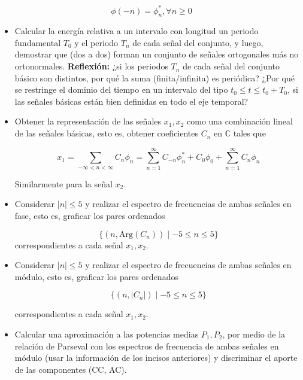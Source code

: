 \documentclass[12pt,a4paper]{report}
\begin{document}
\begin{enumerate}[label=\alph*),left=0pt]
  $$\phi(-n) = \phi_n^*, \forall n \geq 0$$

  \begin{itemize}[left=0pt]

    \item Calcular la energía relativa a un intervalo con longitud un periodo fundamental $T_0$ y el periodo $T_n$ de
      cada señal del conjunto, y luego, demostrar que (dos a dos) forman un conjunto de señales ortogonales más no
      ortonormales.\newline
      \textbf{Reflexión:} ¿si los periodos $T_n$ de cada señal del conjunto básico son distintos, por qué la suma
      (finita/infinita) es periódica? ¿Por qué se restringe el dominio del tiempo en un intervalo del tipo 
      $t_0 \leq t \leq t_0 + T_0$, si las señales básicas están bien definidas en todo el eje temporal?

    \item Obtener la representación de las señales $x_1, x_2$ como una combinación lineal de las señales básicas, esto 
      es, obtener coeficientes $C_n$ en $\mathbb{C}$ tales que

      $$x_1 = \sum_{-\infty < n < \infty} C_n \phi_n =
      \sum_{n=1}^{\infty} C_{-n} \phi_n^* + C_0 \phi_0 + \sum_{n=1}^{\infty} C_n \phi_n$$

      Similarmente para la señal $x_2$.

    \item Considerar $|n| \leq 5$ y realizar el espectro de frecuencias de ambas señales en fase, esto es, graficar los 
      pares ordenados

      $$\{(n, \text{Arg}(C_n)) \mid -5 \leq n \leq 5\}$$
      correspondientes a cada señal $x_1, x_2$.

      \item Considerar $|n| \leq 5$ y realizar el espectro de frecuencias de ambas señales en módulo, esto es, graficar 
        los pares ordenados

      $$\{(n, |C_n|) \mid -5 \leq n \leq 5\}$$

      correspondientes a cada señal $x_1, x_2$.\newline

    \item Calcular una aproximación a las potencias medias $P_1, P_2$, por medio de la relación de Parseval con los 
      espectros de frecuencia de ambas señales en módulo (usar la información de los incisos anteriores) y discriminar 
      el aporte de las componentes (CC, AC).


\end{itemize}
\end{enumerate}
\end{document}
